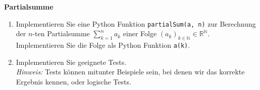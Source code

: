 \textbf{Partialsumme}\\
\begin{enumerate}
	\item Implementieren Sie eine Python Funktion \texttt{partialSum(a, n)} zur Berechnung der $n$-ten Partialsumme $\sum_{k=1}^n a_k$ einer Folge ${(a_k)}_{k\in\mathbb{N}} \in \mathbb{R}^\mathbb{N}$. Implementieren Sie die Folge als Python Funktion \texttt{a(k)}.
	\item Implementieren Sie geeignete Tests.\\
	\textit{Hinweis:} Tests können mitunter Beispiele sein, bei denen wir das korrekte Ergebnis kennen, oder logische Tests.
\end{enumerate}

